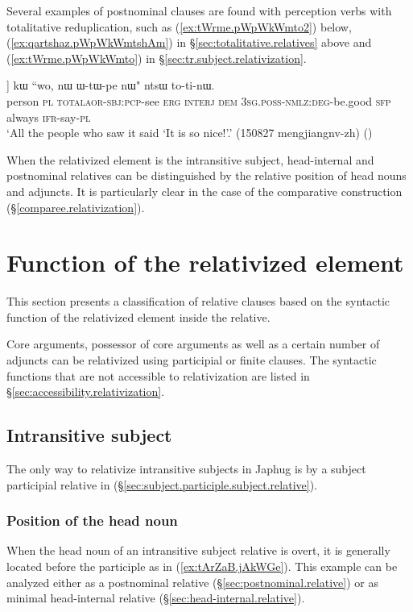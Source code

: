 Several examples of postnominal clauses are found with perception verbs with totalitative reduplication, such as  (\ref{ex:tWrme.pWpWkWmto2})  below, (\ref{ex:qartshaz.pWpWkWmtshAm}) in §\ref{sec:totalitative.relatives} above and (\ref{ex:tWrme.pWpWkWmto}) in §\ref{sec:tr.subject.relativization}.
 
 \begin{exe}
\ex \label{ex:tWrme.pWpWkWmto2}
\gll [\textbf{tɯrme} \textbf{ra} [pɯ\redp{}pɯ-kɯ-mto]] kɯ ``wo, nɯ ɯ-tɯ-pe nɯ" ntsɯ to-ti-nɯ. \\
person \textsc{pl} \textsc{total}\redp{}\textsc{aor}-\textsc{sbj}:\textsc{pcp}-see \textsc{erg} \textsc{interj} \textsc{dem} \textsc{3sg}.\textsc{poss}-\textsc{nmlz}:\textsc{deg}-be.good \textsc{sfp} always \textsc{ifr}-say-\textsc{pl} \\
\glt `All the people who saw it said `It is so nice!'.' (150827 mengjiangnv-zh)
()
\end{exe}
 
When the relativized element is the intransitive subject, head-internal and postnominal relatives can be distinguished by the relative position of head nouns and adjuncts. It is particularly clear in the case of the comparative construction (§\ref{comparee.relativization}).


\section{Function of the relativized element}\label{sec:function.relativization} 
This section presents a classification of relative clauses based on the syntactic function of the relativized element inside the relative. 

Core arguments, possessor of core arguments as well as a certain number of adjuncts can be relativized using participial or finite clauses. The syntactic functions that are not accessible to relativization are listed in §\ref{sec:accessibility.relativization}.


\subsection{Intransitive subject} \label{sec:intr.subject.relativization} 
The only way to relativize intransitive subjects in Japhug is by a subject participial relative in  (§\ref{sec:subject.participle.subject.relative}). 

\subsubsection{Position of the head noun} \label{sec:intr.subj.head.noun.position}
When the head noun of an intransitive subject relative is overt, it is generally located before the participle as in (\ref{ex:tArZaB.jAkWGe}). This example can be analyzed either as a postnominal relative (§\ref{sec:postnominal.relative}) or as minimal head-internal relative (§\ref{sec:head-internal.relative}).

